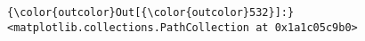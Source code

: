\documentclass[11pt]{article}
\begin{document}
\begin{Verbatim}[commandchars=\\\{\}]
{\color{outcolor}Out[{\color{outcolor}532}]:} <matplotlib.collections.PathCollection at 0x1a1c05c9b0>
\end{Verbatim}
            
    \begin{center}
    \end{center}
    { \hspace*{\fill} \\}
    

    
    
    
    
\end{document}
